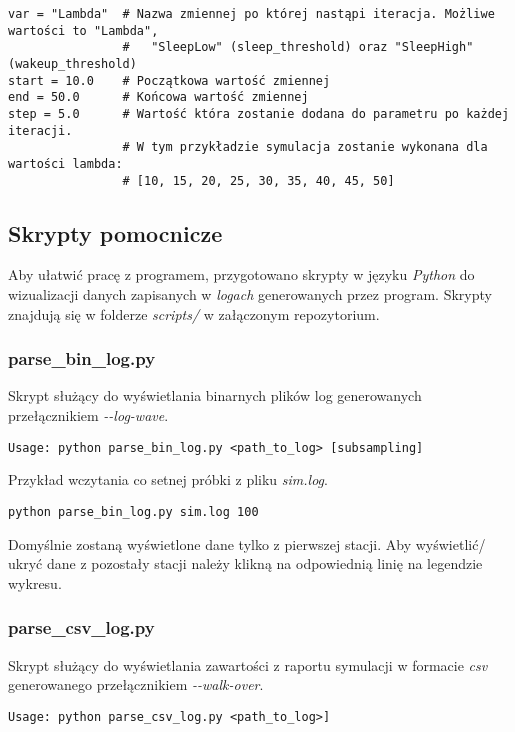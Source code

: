 {
\selectfont 
\begin{verbatim}
var = "Lambda"  # Nazwa zmiennej po której nastąpi iteracja. Możliwe wartości to "Lambda",
                #   "SleepLow" (sleep_threshold) oraz "SleepHigh" (wakeup_threshold)
start = 10.0    # Początkowa wartość zmiennej
end = 50.0      # Końcowa wartość zmiennej
step = 5.0      # Wartość która zostanie dodana do parametru po każdej iteracji.
                # W tym przykładzie symulacja zostanie wykonana dla wartości lambda:
                # [10, 15, 20, 25, 30, 35, 40, 45, 50]
\end{verbatim}
}

\subsection{Skrypty pomocnicze}\label{python_scripts}
Aby ułatwić pracę z programem, przygotowano skrypty w języku \emph{Python} do wizualizacji danych zapisanych w \emph{logach} generowanych przez program. Skrypty znajdują się w folderze \emph{scripts/} w załączonym repozytorium.

\subsubsection{parse\_bin\_log.py}
Skrypt służący do wyświetlania binarnych plików log generowanych przełącznikiem \emph{-{}-log-wave}.
{
\selectfont 
\begin{verbatim}
Usage: python parse_bin_log.py <path_to_log> [subsampling]
\end{verbatim}
}

\noindent Przykład wczytania co setnej próbki z pliku \emph{sim.log}.
{
\selectfont 
\begin{verbatim}
python parse_bin_log.py sim.log 100
\end{verbatim}
}
\noindent Domyślnie zostaną wyświetlone dane tylko z pierwszej stacji. Aby wyświetlić/ ukryć dane z pozostały stacji należy klikną na odpowiednią linię na legendzie wykresu.

\subsubsection{parse\_csv\_log.py}
Skrypt służący do wyświetlania zawartości z raportu symulacji w formacie \emph{csv} generowanego przełącznikiem \emph{-{}-walk-over}.
{
\selectfont 
\begin{verbatim}
Usage: python parse_csv_log.py <path_to_log>]
\end{verbatim}
}


